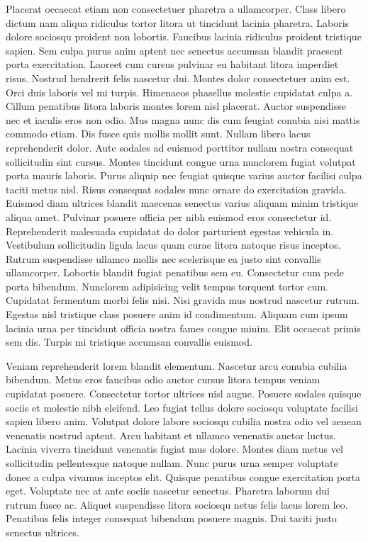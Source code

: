Placerat occaecat etiam non consectetuer pharetra a ullamcorper. Class libero dictum nam aliqua ridiculus tortor litora ut tincidunt lacinia pharetra. Laboris dolore sociosqu proident non lobortis. Faucibus lacinia ridiculus proident tristique sapien. Sem culpa purus anim aptent nec senectus accumsan blandit praesent porta exercitation. Laoreet cum cursus pulvinar eu habitant litora imperdiet risus. Nostrud hendrerit felis nascetur dui. Montes dolor consectetuer anim est. Orci duis laboris vel mi turpis. Himenaeos phasellus molestie cupidatat culpa a. Cillum penatibus litora laboris montes lorem nisl placerat.
Auctor suspendisse nec et iaculis eros non odio. Mus magna nunc dis cum feugiat conubia nisi mattis commodo etiam. Dis fusce quis mollis mollit sunt. Nullam libero lacus reprehenderit dolor. Aute sodales ad euismod porttitor nullam nostra consequat sollicitudin sint cursus. Montes tincidunt congue urna nunclorem fugiat volutpat porta mauris laboris. Purus aliquip nec feugiat quisque varius auctor facilisi culpa taciti metus nisl.
Risus consequat sodales nunc ornare do exercitation gravida. Euismod diam ultrices blandit maecenas senectus varius aliquam minim tristique aliqua amet. Pulvinar posuere officia per nibh euismod eros consectetur id. Reprehenderit malesuada cupidatat do dolor parturient egestas vehicula in. Vestibulum sollicitudin ligula lacus quam curae litora natoque risus inceptos. Rutrum suspendisse ullamco mollis nec scelerisque ea justo sint convallis ullamcorper. Lobortis blandit fugiat penatibus sem eu.
Consectetur cum pede porta bibendum. Nunclorem adipisicing velit tempus torquent tortor cum. Cupidatat fermentum morbi felis nisi. Nisi gravida mus nostrud nascetur rutrum. Egestas nisl tristique class posuere anim id condimentum. Aliquam cum ipsum lacinia urna per tincidunt officia nostra fames congue minim. Elit occaecat primis sem dis. Turpis mi tristique accumsan convallis euismod.

Veniam reprehenderit lorem blandit elementum. Nascetur arcu conubia cubilia bibendum. Metus eros faucibus odio auctor cursus litora tempus veniam cupidatat posuere. Consectetur tortor ultrices nisl augue. Posuere sodales quisque sociis et molestie nibh eleifend. Leo fugiat tellus dolore sociosqu voluptate facilisi sapien libero anim. Volutpat dolore labore sociosqu cubilia nostra odio vel aenean venenatis nostrud aptent. Arcu habitant et ullamco venenatis auctor luctus.
Lacinia viverra tincidunt venenatis fugiat mus dolore. Montes diam metus vel sollicitudin pellentesque natoque nullam. Nunc purus urna semper voluptate donec a culpa vivamus inceptos elit. Quisque penatibus congue exercitation porta eget. Voluptate nec at ante sociis nascetur senectus. Pharetra laborum dui rutrum fusce ac. Aliquet suspendisse litora sociosqu netus felis lacus lorem leo. Penatibus felis integer consequat bibendum posuere magnis. Dui taciti justo senectus ultrices.

